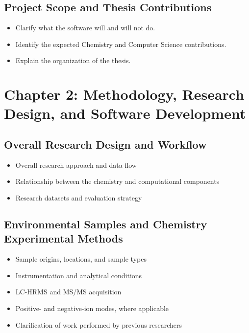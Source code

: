 \documentclass[11pt]{article}
\begin{document}
\begin{doublespace}
    \subsection{Project Scope and Thesis Contributions}
        \begin{itemize}
            \item Clarify what the software will and will not do.
            \item Identify the expected Chemistry and Computer Science contributions.
            \item Explain the organization of the thesis.
        \end{itemize}

\section{Chapter 2: Methodology, Research Design, and Software Development}
    \subsection{Overall Research Design and Workflow}
        \begin{itemize}
            \item Overall research approach and data flow
            \item Relationship between the chemistry and computational components
            \item Research datasets and evaluation strategy
        \end{itemize}

    \subsection{Environmental Samples and Chemistry Experimental Methods}
        \begin{itemize}
        \item Sample origins, locations, and sample types
            \item Instrumentation and analytical conditions
            \item LC-HRMS and MS/MS acquisition
            \item Positive- and negative-ion modes, where applicable
            \item Clarification of work performed by previous researchers 
        \end{itemize}
    

\end{doublespace}
\end{document}
